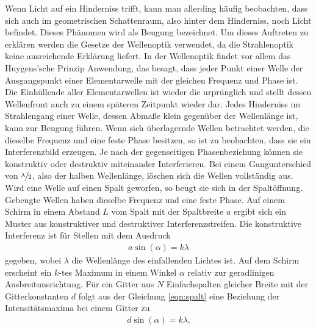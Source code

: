 \noindent
Wenn Licht auf ein Hinderniss trifft, kann man allerding häufig beobachten, dass sich auch im geometrischen Schattenraum, also hinter dem Hinderniss, noch Licht befindet.
Dieses Phänomen wird als Beugung bezeichnet. Um dieses Auftreten zu erklären werden die Gesetze der Wellenoptik verwendet, da die Strahlenoptik keine ausreichende Erklärung liefert.  \newline
In der Wellenoptik findet vor allem das Huygens'sche Prinzip Anwendung, das besagt, dass jeder Punkt einer Welle der Ausgangspunkt einer Elementarwelle mit der gleichen Frequenz und Phase ist.
Die Einhüllende aller Elementarwellen ist wieder die urprünglich und stellt dessen Wellenfront auch zu einem späteren Zeitpunkt wieder dar.
Jedes Hinderniss im Strahlengang einer Welle, dessen Abmaße klein gegenüber der Wellenlänge ist, kann zur Beugung führen. \newline
Wenn sich überlagernde Wellen betrachtet werden, die dieselbe Frequenz und eine feste Phase besitzen, so ist zu beobachten, dass sie ein Interferenzbild erzeugen. Je nach
der gegenseitigen Phasenbeziehung können sie konstruktiv oder destruktiv miteinander Interferieren. Bei einem Gangunterschied von $\sfrac{\lambda}{2}$, also der halben Wellenlänge,
löschen sich die Wellen vollständig aus.
Wird eine Welle auf einen Spalt geworfen, so beugt sie sich in der Spaltöffnung. Gebeugte Wellen haben dieselbe Frequenz und eine feste Phase. Auf einem Schirm in einem Abstand $L$ vom Spalt mit der Spaltbreite $a$
ergibt sich ein Muster aus konstruktiver und destruktiver Interferenzstreifen. Die konstruktive Interferenz ist für Stellen mit dem Ausdruck
\begin{align}
    a\sin(\alpha)=k\lambda
    \label{eqn:spalt}
\end{align}
gegeben, wobei $\lambda$ die Wellenlänge des einfallenden Lichtes ist. Auf dem Schirm erscheint ein $k$-tes Maximum in einem Winkel $\alpha$ relativ zur geradlinigen Ausbreitunsrichtung.
Für ein Gitter aus $N$ Einfachspalten gleicher Breite mit der Gitterkonstanten $d$ folgt aus der Gleichung \eqref{eqn:spalt} eine Beziehung der Intensitätsmaxima bei einem Gitter zu
\begin{align}
    d\sin(\alpha)=k\lambda.
    \label{eqn:lambda}
\end{align}